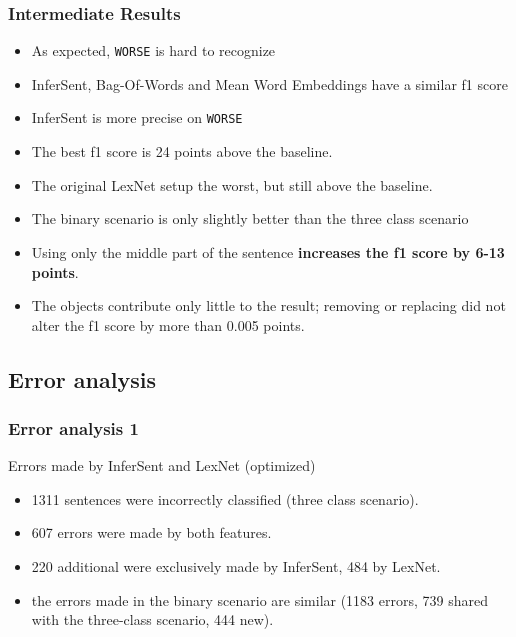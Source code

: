 \documentclass[11pt,aspectratio=169,usenames,dvipsnames]{beamer}
\begin{document}
    \begin{frame}[t]
        \frametitle{Intermediate Results}
        \begin{itemize}
            \item As expected, \texttt{WORSE} is hard to recognize
            \item InferSent, Bag-Of-Words and Mean Word Embeddings have a similar f1 score
            \item InferSent is more precise on \texttt{WORSE}\pause
            \item The best f1 score is 24 points above the baseline.
            \item The original LexNet setup the worst, but still above the baseline.
            \item The binary scenario is only slightly better than the three class scenario\pause
            \item Using only the middle part of the sentence \textbf{increases the f1 score by 6-13 points}.
            \item The objects contribute only little to the result; removing or replacing did not alter the f1 score by more than 0.005 points.
        \end{itemize}
    \end{frame}

    \subsection{Error analysis}
    \begin{frame}[t]
        \frametitle{Error analysis 1}
        Errors made by InferSent and LexNet (optimized)
        \begin{itemize}
            \item<1> 1311 sentences were incorrectly classified (three class scenario).
            \item<1> 607 errors were made by both features.
            \item<1> 220 additional were exclusively made by InferSent, 484 by LexNet.
            \item<1> the errors made in the binary scenario are similar (1183 errors, 739 shared with the three-class scenario, 444 new).
           
        \end{itemize}

    \end{frame}
    
\end{document}
